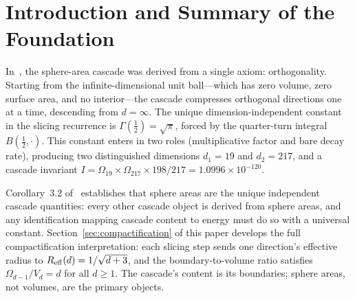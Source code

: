 \documentclass[12pt,a4paper]{article}
\begin{document}
\begin{abstract}
Part~0 establishes that sphere areas are the unique independent cascade quantities
(Corollary~3.2). This paper proves the compactification radius
$R_{\rm eff}=1/\sqrt{d+3}$ from the Beta function and develops the full geometric
interpretation: each slicing step sends one direction's effective radius to
$R_{\rm eff}$, giving concrete geometric
content to the arrow of time as asymptotic suppression rather than sharp elimination. The
cascade's two natural length scales---the compactification radius and the Gaussian width of
the slicing integrand---coincide asymptotically, producing a second universal cascade constant
$\operatorname{erf}(1/\sqrt{2}) = 0.68269$. The boundary dominance
$\Omega_{d-1}/V_d=d$ (Theorem~3.1 of~\cite{paperI}) confirms that the observer's state
space is the unit sphere because the cascade's content is its boundaries. The cascade fixes
the arena (which Hilbert space), the measure (why Gaussian), and the normalisation constant
($\sqrt{\pi}$) that standard quantum mechanics postulates. The value of $\hbar$ is not
derived; it enters as the ratio of the forced precession scale $\pi/2$ to the physical time
increment, and therefore encodes only the unit matching between geometric and physical time.
No physical law or free geometric parameter beyond the observer's dimensionality enters the
derivation.
\end{abstract}

\tableofcontents
\newpage

\section{Introduction and Summary of the Foundation}

In~\cite{paperI}, the sphere-area cascade was derived from a single axiom: orthogonality.
Starting from the infinite-dimensional unit ball---which has zero volume, zero surface area,
and no interior---the cascade compresses orthogonal directions one at a time, descending
from $d=\infty$. The unique dimension-independent constant in the slicing recurrence is
$\Gamma(\tfrac{1}{2})=\sqrt{\pi}$, forced by the quarter-turn integral $B(\tfrac{1}{2},\cdot)$.
This constant enters in two roles (multiplicative factor and bare decay rate), producing two
distinguished dimensions $d_1=19$ and $d_2=217$, and a cascade invariant
$I=\Omega_{19}\times\Omega_{217}\times 198/217=1.0996\times 10^{-120}$.

Corollary~3.2 of~\cite{paperI} establishes that sphere areas are the unique independent
cascade quantities: every other cascade object is derived from sphere areas, and any
identification mapping cascade content to energy must do so with a universal constant.
Section~\ref{sec:compactification} of this paper develops the full compactification
interpretation: each slicing step sends one direction's effective radius to
$R_{\rm eff}(d)=1/\sqrt{d+3}$, and the boundary-to-volume ratio satisfies
$\Omega_{d-1}/V_d=d$ for all $d\geq 1$. The cascade's content is its boundaries; sphere
areas, not volumes, are the primary objects.
\end{document}
